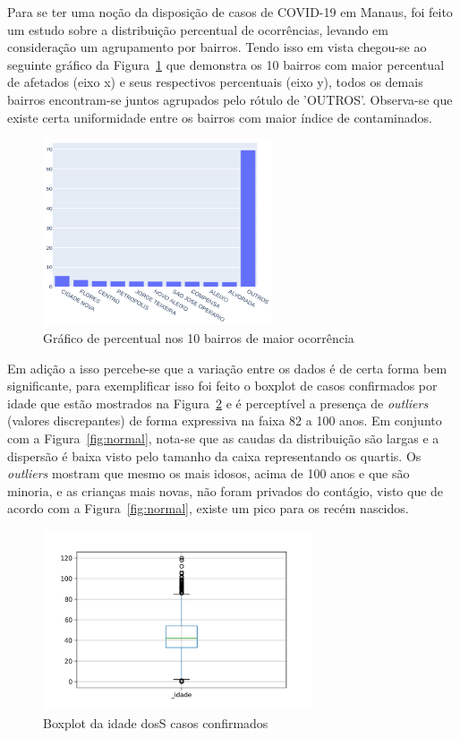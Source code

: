 Para se ter uma noção da disposição de casos de COVID-19 em Manaus, foi feito um estudo sobre a distribuição percentual de ocorrências, levando em consideração um agrupamento por bairros. Tendo isso em vista chegou-se ao seguinte gráfico da Figura~\ref{fig:uc3} que demonstra os 10 bairros com maior percentual de afetados (eixo x) e seus respectivos percentuais (eixo y), todos os demais bairros encontram-se juntos agrupados pelo rótulo de 'OUTROS'. Observa-se que existe certa uniformidade entre os bairros com maior índice de contaminados.
\begin{figure}[!ht]
\centering
    \includegraphics[width=6.8cm]{img/percentualPorBairro.png}
    \caption{Gráfico de percentual nos 10 bairros de maior ocorrência}
    \label{fig:uc3} %
\end{figure}

Em adição a isso percebe-se que a variação entre os dados é de certa forma bem significante, para exemplificar isso foi feito o boxplot de casos confirmados por idade que estão mostrados na Figura~\ref{fig:uc4} e é perceptível a presença de \textit{outliers} (valores discrepantes) de forma expressiva na faixa 82 a 100 anos. Em conjunto com a Figura~\ref{fig:normal}, nota-se que as caudas da distribuição são largas e a dispersão  é baixa visto pelo tamanho da caixa representando os quartis. Os \textit{outliers} mostram que mesmo os mais idosos, acima de 100 anos e que são minoria, e as crianças mais novas, não foram privados do contágio, visto que de acordo com a Figura~\ref{fig:normal}, existe um pico para os recém nascidos.

\begin{figure}[!ht]
\centering
    \includegraphics[width=8cm]{img/boxplot.png}
    \caption{Boxplot da idade dosS casos confirmados}
    \label{fig:uc4} %
\end{figure}

